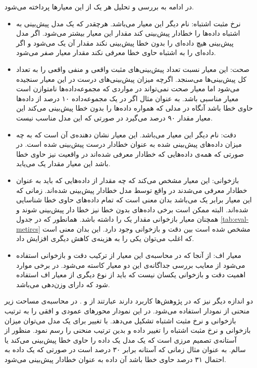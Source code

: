 در ادامه به بررسی و تحلیل هر یک از این معیارها پرداخته می‌شود. 
\begin{itemize}
	\item 
	نرخ مثبت اشتباه: نام دیگر این معیار  می‌باشد. هرچقدر که یک مدل پیش‌بینی به اشتباه داده‌ها را خطادار پیش‌بینی کند مقدار این معیار بیشتر می‌شود. اگر مدل پیش‌بینی هیچ داده‌ای را بدون خطا پیش‌بینی نکند مقدار آن یک می‌شود و اگر داده‌ای را به اشتباه حاوی خطا معرفی نکند مقدار معیار صفر می‌شود. 
\item 
صحت: این معیار نسبت تعداد پیش‌بینی‌های مثبت واقعی و منفی واقعی را به تعداد کل پیش‌بینی‌ها می‌سنجد. اگرچه میزان پیش‌بینی‌های درست در این معیار سنجیده می‌شود  اما معیار صحت نمی‌تواند در مواردی که مجموعه‌داده‌ها نا‌متوازن است معیار مناسبی باشد. به عنوان مثال اگر در یک مجموعه‌داده ۱۰ درصد از داده‌ها حاوی خطا باشد آنگاه  در مدلی که همواره داده‌ها را بدون خطا پیش‌بینی می‌کند این معیار مقدار ۹۰ درصد می‌گیرد در صورتی که این مدل مناسب نیست. 
\item
دقت: نام دیگر این معیار  می‌باشد. این معیار نشان دهنده‌ی آن است که به چه میزان داده‌های پیش‌بینی شده به عنوان خطادار درست پیش‌بینی شده است.  در صورتی که همه‌ی داده‌هایی که خطادار معرفی شده‌اند در واقعیت نیز حاوی خطا باشد این معیار مقدار یک می‌یابد. 
\item 
بازخوانی: این معیار مشخص می‌کند که چه مقدار از داده‌هایی که باید به عنوان خطادار معرفی می‌شدند در واقع توسط مدل خطادار پیش‌بینی شده‌اند.  زمانی که این معیار برابر یک می‌باشد بدان معنی است که تمام داده‌‌های حاوی خطا شناسایی شده‌اند. البته ممکن است برخی داده‌های بدون خطا نیز خطا دار پیش‌بینی شوند و همچنان معیار بازخوانی مقدار یک را داشته باشد. همانطور که در جدول \ref{tab:eval-metircs} مشخص شده ‌است بین دقت و بازخوانی   وجود دارد. این بدان معنی است که اغلب می‌توان یکی را به هزینه‌ی کاهش دیگری افزایش داد. 
\item
معیار اف: از آنجا که در محاسبه‌ی این معیار از ترکیب دقت و بازخوانی استفاده می‌شود از معایب بررسی جداگانه‌ی این دو معیار کاسته می‌شود. در برخی موارد اهمیت دقت و بازخوانی یکسان نیست که باید از نوع دیگری از معیار اف استفاده شود که دارای وزن‌دهی می‌باشد. 
\end{itemize}





دو اندازه دیگر نیز که در پژوهش‌ها کاربرد دارند عبارتند از  و . در محاسبه‌ی مساحت زیر منحنی از  نمودار  استفاده می‌شود. در این نمودار محورهای عمودی و افقی را به ترتیب بازخوانی و  نرخ مثبت اشتباه تشکیل می‌دهد.  با تغییر  برای یک مدل می‌توان میزان بازخوانی و  نرخ مثبت اشتباه را تغییر داده و بدین ترتیب منحنی را رسم نمود.  منظور از آستانه‌ی تصمیم  مرزی است  که یک مدل یک داده را حاوی خطا پیش‌بینی می‌کند یا سالم. به عنوان مثال زمانی که آستانه برابر ۳۰ درصد است در صورتی که یک داده به احتمال ۳۱ درصد حاوی خطا باشد آن داده به عنوان خطادار پیش‌بینی می‌شود. \\

